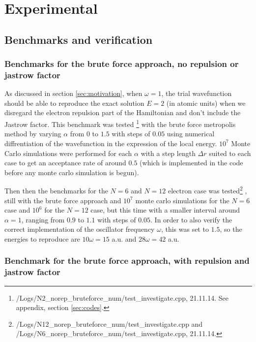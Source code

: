 \section{Experimental}

\subsection{Benchmarks and verification} \label{sec:exp_benchmarks}

\subsubsection{Benchmarks for the brute force approach, no repulsion or jastrow factor}
As discussed in section \ref{sec:motivation}, when $\omega = 1$, the trial wavefunction should be able to reproduce the exact solution $E=2$ (in atomic units) when we disregard the electron repulsion part of the Hamiltonian and don't include the Jastrow factor. 
This benchmark was tested
\footnote{/Logs/N2\_norep\_bruteforce\_num/test\_investigate.cpp, 21.11.14. See appendix, section \ref{sec:codes}.}
with the brute force metropolis method by varying $\alpha$ from $0$ to $1.5$ with steps of $0.05$ using numerical diffrentiation of the wavefunction in the expression of the local energy. 
$10^7$ Monte Carlo simulations were performed for each $\alpha$ with a step length $\Delta r$ suited to each case to get an acceptance rate of around $0.5$ (which is implemented in the code before any monte carlo simulation is begun).

Then then the benchmarks for the $N=6$ and $N=12$ electron case was tested\footnote{/Logs/N12\_norep\_bruteforce\_num/test\_investigate.cpp and /Logs/N6\_norep\_bruteforce\_num/test\_investigate.cpp, 21.11.14. }
, still with the brute force approach and $10^7$ monte carlo simulations for the $N=6$ case and $10^6$ for the $N=12$ case, but this time with a smaller interval around $\alpha=1$, ranging from $0.9$ to $1.1$ with steps of $0.05$. 
In order to also verify the correct implementation of the oscillator frequency $\omega$, this was set to $1.5$, so the energies to reproduce are $10 \omega = 15$ a.u. and $28 \omega = 42$ a.u. 

\subsubsection{Benchmark for the brute force approach, with repulsion and jastrow factor}

